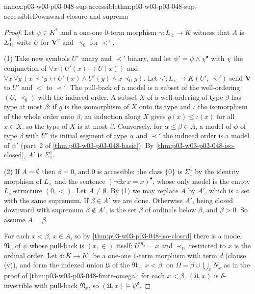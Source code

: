 \begin{annexitem}{annex:p03-w03-p03-048-sup-accessible}{thm:p03-w03-p03-048-sup-accessible}{Downward closure and suprema}
\begin{proof}
Let \(\psi\in K^{\ast}\) and a one-one \(0\)-term morphism
\(\gamma:L_{<}\to K\) witness that \(A\) is \(\Sigma^1_1\); write \(U\) for
\(\mathbf V^{\gamma}\) and \(\prec_0\) for \(<^{\gamma}\).

(1) Take new symbols \(U'\) unary and \(\prec'\) binary, and let
\(\psi'=\psi\land\chi^{\bullet}\) with \(\chi\) the conjunction of
\(\forall x\,(U'(x)\to U(x))\) and \(\forall x\,\forall y\,(x\prec'y\leftrightarrow
U'(x)\land U'(y)\land x\prec_0 y)\).  Let \(\gamma':L_{<}\to K(U',\prec')\)
send \(\mathbf V\) to \(U'\) and \(<\) to \(\prec'\).  The pull-back of a
model is a subset of the well-ordering \((U,\prec_0)\) with the induced
order.  A subset \(X\) of a well-ordering of type \(\beta\) has type at most
\(\beta\): if \(g\) is the isomorphism of \(X\) onto its type and \(\iota\)
the isomorphism of the whole order onto \(\beta\), an induction along \(X\)
gives \(g(x)\leq\iota(x)\) for all \(x\in X\), so the type of \(X\) is at
most \(\beta\).  Conversely, for \(\alpha\leq\beta\in A\), a model of
\(\psi\) of type \(\beta\) with \(U'\) its initial segment of type
\(\alpha\) and \(\prec'\) the induced order is a model of \(\psi'\) (part~2
of \cref{thm:p03-w03-p03-048-basic}).  By
\cref{thm:p03-w03-p03-048-iso-closed}, \(A'\) is \(\Sigma^1_1\).

(2) If \(A=\emptyset\) then \(\beta=0\), and \(0\) is accessible: the class
\(\{0\}\) is \(\Sigma^1_1\) by the identity morphism of \(L_{<}\) and the
sentence \((\neg\exists x\,x=x)^{\bullet}\), whose only model is the empty
\(L_{<}\)-structure \((0,<)\).  Let \(A\neq\emptyset\).  By (1) we may
replace \(A\) by \(A'\), which is a set with the same supremum.  If
\(\beta\in A'\) we are done.  Otherwise \(A'\), being closed downward with
supremum \(\beta\notin A'\), is the set \(\beta\) of ordinals below
\(\beta\), and \(\beta>0\).  So assume \(A=\beta\).

For each \(x<\beta\), \(x\in A\), so by \cref{thm:p03-w03-p03-048-iso-closed}
there is a model \(\mathfrak N_x\) of \(\psi\) whose pull-back is
\((x,\in)\) itself: \(U^{\mathfrak N_x}=x\) and \(\prec_0\) restricted to
\(x\) is the ordinal order.  Let \(\delta:K\to K_1\) be a one-one
\(1\)-term morphism with term \(d\) (clause (v)), and form the indexed
union \(\mathfrak U\) of the \(\mathfrak N_x\), \(x<\beta\), on
\(\Omega=\beta\cup\bigcup_x N_x\) as in the proof of
\cref{thm:p03-w03-p03-048-finite-omega}; for each \(x<\beta\),
\((\mathfrak U,x)\) is \(\delta\)-invertible with pull-back
\(\mathfrak N_x\), so \((\mathfrak U,x)\models\psi^{\delta}\).


\end{proof}
\end{annexitem}
